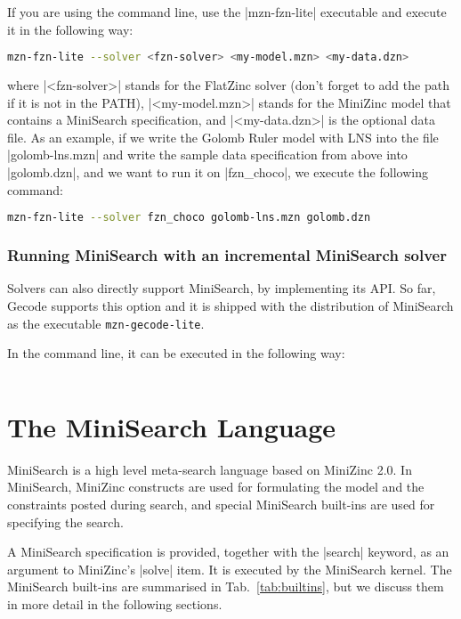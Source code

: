 \documentclass[a4paper,13pt,onecolumn]{article}%
\newcommand{\MiniZinc}{\mbox{\sc MiniZinc}\xspace}
\newcommand{\MiniSearch}{\mbox{\sc MiniSearch}\xspace}
\newcommand{\mzngecodelite}{\texttt{mzn-gecode-lite}}
\begin{document}
If you are using the command line, use the \mzninline|mzn-fzn-lite|
executable and execute it in the following way:
\begin{lstlisting}[language=bash]
mzn-fzn-lite --solver <fzn-solver> <my-model.mzn> <my-data.dzn>
\end{lstlisting}
where \mzninline|<fzn-solver>| stands for the FlatZinc
solver (don't forget to add the path if it is not in the PATH), 
\mzninline|<my-model.mzn>| stands for the MiniZinc model that
contains a MiniSearch specification, and \mzninline|<my-data.dzn>|
is the optional data file. As an example, if we write the 
Golomb Ruler model with LNS into the file \mzninline|golomb-lns.mzn|
and write the sample data specification from above into 
\mzninline|golomb.dzn|, and we want to run it on \mzninline|fzn_choco|,
we execute the following command:
\begin{lstlisting}[language=bash]
mzn-fzn-lite --solver fzn_choco golomb-lns.mzn golomb.dzn
\end{lstlisting}

\subsubsection{Running MiniSearch with an incremental MiniSearch solver}

Solvers can also directly support MiniSearch, by implementing its API.
So far, Gecode supports this option and it is shipped with the distribution
of MiniSearch as the executable \mzngecodelite.

In the command line, it can be executed in the following way:
\begin{lstlisting}[language=bash]
%*\mzngecodelite    <my-model.mzn> <my-data.dzn>
\end{lstlisting}


\section{The MiniSearch Language}
\label{sec:minisearch}

\MiniSearch is a high level meta-search language based on \MiniZinc 2.0. In \MiniSearch, \MiniZinc constructs are used for formulating the model and the constraints posted during search, and special \MiniSearch built-ins are used for specifying the search.

A \MiniSearch specification is provided, together with the \mzninline|search| keyword, as an argument to \MiniZinc's \mzninline|solve| item. It is executed by the \MiniSearch kernel.
The \MiniSearch built-ins are summarised in Tab.~\ref{tab:builtins}, but we discuss them in more detail
in the following sections.
\end{document}
